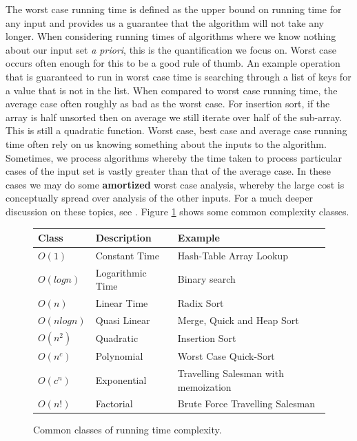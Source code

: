 \documentclass[10pt,a4paper]{article}
\begin{document}
\newline\newline
The worst case running time is defined as the upper bound on running time for any input and provides us a guarantee that the algorithm will not take any longer. When considering running times of algorithms where we know nothing about our input set {\it a priori}, this is the quantification we focus on. Worst case occurs often enough for this to be a good rule of thumb. An example operation that is guaranteed to run in worst case time is searching through a list of keys for a value that is not in the list. When compared to worst case running time, the average case often roughly as bad as the worst case. For insertion sort, if the array is half unsorted then on average we still iterate over half of the sub-array. This is still a quadratic function. Worst case, best case and average case running time often rely on us knowing something about the inputs to the algorithm. Sometimes, we process algorithms whereby the time taken to process particular cases of the input set is vastly greater than that of the average case. In these cases we may do some {\bf amortized} worst case analysis, whereby the large cost is conceptually spread over analysis of the other inputs. For a much deeper discussion on these topics, see \cite{INTROALG}. Figure \ref{comclasses} shows some common complexity classes.
\begin{figure}
\caption{Common classes of running time complexity.}
\begin{center}
\begin{tabular}{| l | l | l | }
  \hline
  Class & Description & Example \\
  \hline
  $O(1)$ & Constant Time & Hash-Table Array Lookup \\
  $O(log n)$ & Logarithmic Time & Binary search \\
  $O(n)$ & Linear Time & Radix Sort   \\
  $O(n log n)$ & Quasi Linear & Merge, Quick and Heap Sort \\
  $O(n^2)$ & Quadratic & Insertion Sort \\
  $O(n^c)$ & Polynomial &  Worst Case Quick-Sort \\
  $O(c^n)$ & Exponential & Travelling Salesman with memoization \\
  $O(n!)$ & Factorial & Brute Force Travelling Salesman \\
  \hline
\end{tabular}
\label{comclasses}
\end{center}
\end{figure}
\end{document}
